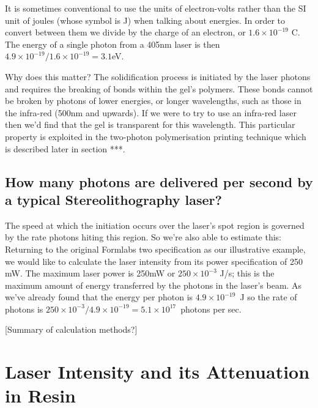 It is sometimes conventional to use the units of electron-volts rather than the SI unit of joules (whose symbol is J) when talking about energies. In order to convert between them we divide by the charge of an electron, or $1.6 \times 10^{-19}$ C. The energy of a single photon from a 405nm laser is then $4.9 \times 10^{-19} / 1.6 \times 10^{-19} = 3.1$eV. 

Why does this matter? The solidification process is initiated by the laser photons and requires the breaking of bonds within the gel's polymers. These bonds cannot be broken by photons of lower energies, or longer wavelengths, such as those in the infra-red (500nm and upwards). If we were to try to use an infra-red laser then we'd find that the gel is transparent for this wavelength. This particular property is exploited in the two-photon polymerisation printing technique which is described later in section ***. 

\subsection{How many photons are delivered per second by a typical Stereolithography laser?} 

The speed at which the initiation occurs over the laser's spot region is governed by the rate photons hiting this region. So we're also able to estimate this: Returning to the original Formlabs two specification as our illustrative example, we would like to calculate the laser intensity from its power specification of 250 mW. The maximum laser power is 250mW or $250 \times 10^{-3}$ J/s; this is the maximum amount of energy transferred by the photons in the laser's beam. As we've already found that the energy per photon is $4.9 \times 10^{-19}$~J so the rate of photons is $250 \times 10^{-3} / 4.9 \times 10^{-19} = 5.1 \times 10^{17}$~photons per sec. 

[Summary of calculation methods?]

\section{Laser Intensity and its Attenuation in Resin}


